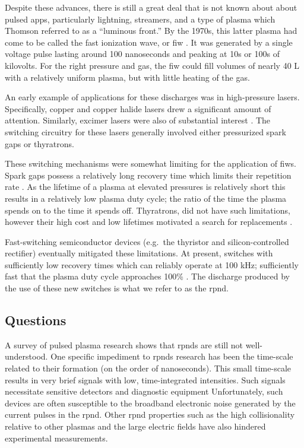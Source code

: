 Despite these advances, there is still a great deal that is not known about
about pulsed \acs{app}s, particularly lightning, streamers, and a type of plasma
which Thomson referred to as a ``luminous front.'' By the 1970s, this latter
plasma had come to be called the fast ionization wave, or \acs{fiw}
\cite{Vasilyak1994}. It was generated by a single voltage pulse lasting around
100 nanoseconds and peaking at 10s or 100s of kilovolts. For the right pressure
and gas, the \acs{fiw} could fill volumes of nearly 40 L with a relatively
uniform plasma, but with little heating of the gas.

An early example of applications for these discharges was in high-pressure
lasers. Specifically, copper \cite{Kushner1983} and copper halide
\cite{Pack1977} lasers drew a significant amount of attention. Similarly,
excimer lasers were also of substantial interest \cite{Shimada1985}. The
switching circuitry for these lasers generally involved either pressurized spark
gaps or thyratrons.

These switching mechanisms were somewhat limiting for the application of
\acs{fiw}s. Spark gaps possess a relatively long recovery time which limits
their repetition rate \cite{Moran1991}. As the lifetime of a plasma at elevated
pressures is relatively short this results in a relatively low plasma duty
cycle; the ratio of the time the plasma spends on to the time it spends off.
Thyratrons, did not have such limitations, however their high cost and low
lifetimes motivated a search for replacements \cite{Partlo1995}.

Fast-switching semiconductor devices (e.g.\ the thyristor and silicon-controlled
rectifier) eventually mitigated these limitations. At present, switches with
sufficiently low recovery times which can reliably operate at 100 kHz;
sufficiently fast that the plasma duty cycle approaches 100\% \cite{Efanov1997}.
The discharge produced by the use of these new switches is what we refer to as
the \acs{rpnd}.

\subsection{Questions}

A survey of pulsed plasma research shows that \acs{rpnd}s are still not
well-understood. One specific impediment to \acs{rpnd}s research has been the
time-scale related to their formation (on the order of nanoseconds). This small
time-scale results in very brief signals with low, time-integrated intensities.
Such signals necessitate sensitive detectors and diagnostic equipment
Unfortunately, such devices are often susceptible to the broadband electronic
noise generated by the current pulses in the \acs{rpnd}. Other \acs{rpnd}
properties such as the high collisionality relative to other plasmas and the
large electric fields have also hindered experimental measurements.

